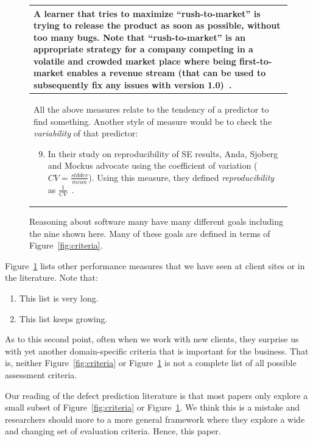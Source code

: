 \documentclass{sig-alternative}
\newcommand{\be}{\begin{enumerate}}
\newcommand{\ee}{\end{enumerate}}
\newcommand{\fig}[1]{Figure~\ref{fig:#1}}
\begin{document}
\begin{figure}[!t]
\begin{tabular}{|p{.95\linewidth}|}
A learner that tries to maximize ``rush-to-market'' is trying to release the product as soon
as possible, without too many bugs. Note that ``rush-to-market'' is an appropriate strategy for a company competing
in a volatile and crowded market place where being first-to-market enables a revenue stream (that can be
used to subsequently fix any issues with version 1.0)~\cite{huang06}.
\ee
\\\hline
All the above measures relate to the tendency of a predictor to find something. Another style
of measure would be to check the {\em variability} of that predictor:
\be
\setcounter{enumi}{8}
\item
In their study on reproducibility of SE results,
 Anda, Sjoberg and Mockus advocate using the coefficient of variation ($CV=\frac{stddev}{mean}$).
Using this measure, they defined {\em reproducibility} as $\frac{1}{CV}$~\cite{anda09}.
\ee
\\\hline
\end{tabular}
\caption{Reasoning about software many have many different goals including the nine shown here. Many of
these goals are defined in terms of 
\fig{criteria}.
}\label{fig:goals}
\end{figure}
\fig{goals} lists other performance measures that we have seen at client sites or in the literature. Note that:
\be
\item This list is very long.
\item This list keeps growing.
\ee As to this second point,
often when we work
with new clients, they surprise us with yet another domain-specific criteria that is important for the business.
That is, neither \fig{criteria} or \fig{goals} is not a complete list of all possible assessment criteria.

Our reading of the defect prediction literature is that most papers only explore a small subset of 
 \fig{criteria} or \fig{goals}. We think this is a mistake and researchers should more to a more general
framework where they explore a wide and changing set of evaluation criteria. 
Hence, this paper.
\end{document}
